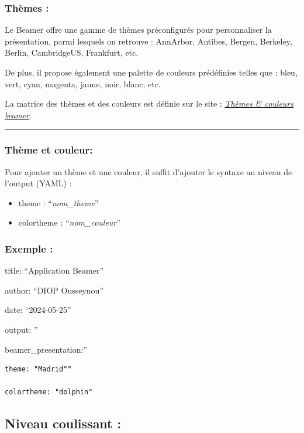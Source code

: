 \documentclass[
  12pt,
]{article}
\begin{document}
\subsubsection{Thèmes :}\label{thuxe8mes}

Le Beamer offre une gamme de thèmes préconfigurés pour personnaliser la
présentation, parmi lesquels on retrouve : AnnArbor, Antibes, Bergen,
Berkeley, Berlin, CambridgeUS, Frankfurt, etc.

De plus, il propose également une palette de couleurs prédéfinies telles
que : bleu, vert, cyan, magenta, jaune, noir, blanc, etc.

La matrice des thèmes et des couleurs est définie sur le site :
\href{https://bookdown.org/yihui/rmarkdown/beamer-presentation.html}{\emph{Thèmes
\& couleurs beamer}}.

\begin{center}\rule{0.5\linewidth}{0.5pt}\end{center}

\subsubsection{Thème et couleur:}\label{thuxe8me-et-couleur}

Pour ajouter un thème et une couleur, il suffit d'ajouter le syntaxe au
niveau de l'output (YAML) :

\begin{itemize}
\item
  theme : ``\emph{nom\_theme}''
\item
  colortheme : ``\emph{nom\_couleur}''
\end{itemize}

\subsubsection{Exemple :}\label{exemple}

title: ``Application Beamer''

author: ``DIOP Ousseynou''

date: ``2024-05-25''

output: ''

beamer\_presentation:''

\begin{verbatim}
theme: "Madrid"" 

colortheme: "dolphin"
\end{verbatim}

\subsection{Niveau coulissant :}\label{niveau-coulissant}
\end{document}
